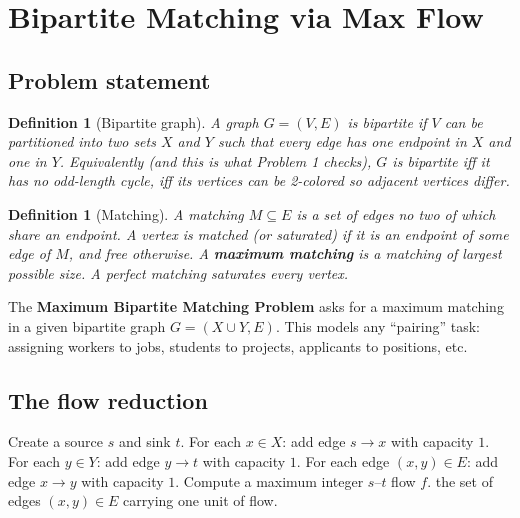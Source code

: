 \documentclass[11pt]{article}
\newtheorem{definition}[theorem]{Definition}
\begin{document}
\section{Bipartite Matching via Max Flow}

\subsection{Problem statement}

\begin{definition}[Bipartite graph]
A graph $G=(V,E)$ is \emph{bipartite} if $V$ can be partitioned into two sets
$X$ and $Y$ such that every edge has one endpoint in $X$ and one in $Y$.
Equivalently (and this is what Problem 1 checks), $G$ is bipartite iff it has no
odd-length cycle, iff its vertices can be 2-colored so adjacent vertices differ.
\end{definition}

\begin{definition}[Matching]
A \emph{matching} $M \subseteq E$ is a set of edges no two of which share an
endpoint. A vertex is \emph{matched} (or \emph{saturated}) if it is an endpoint
of some edge of $M$, and \emph{free} otherwise. A \textbf{maximum matching} is a
matching of largest possible size. A \emph{perfect matching} saturates every
vertex.
\end{definition}

The \textbf{Maximum Bipartite Matching Problem} asks for a maximum matching in a
given bipartite graph $G=(X \cup Y, E)$. This models any ``pairing'' task:
assigning workers to jobs, students to projects, applicants to positions, etc.

\subsection{The flow reduction}

\begin{algorithm}[h]
\caption{Bipartite Matching via Max Flow}
\begin{algorithmic}[1]
\State Create a source $s$ and sink $t$.
\State For each $x \in X$: add edge $s \to x$ with capacity $1$.
\State For each $y \in Y$: add edge $y \to t$ with capacity $1$.
\State For each edge $(x,y) \in E$: add edge $x \to y$ with capacity $1$.
\State Compute a maximum integer $s$--$t$ flow $f$.
\State \Return the set of edges $(x,y) \in E$ carrying one unit of flow.
\end{algorithmic}
\end{algorithm}
\end{document}
